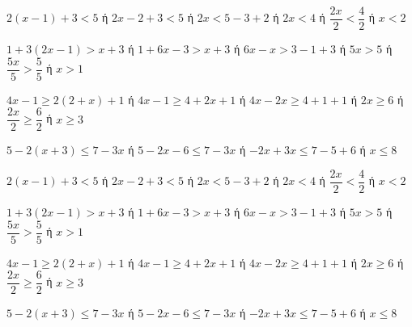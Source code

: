 \begin{alist}
\item $ 2(x-1)+3<5 $ ή $ 2x-2+3<5 $ ή $ 2x<5-3+2 $ ή $ 2x<4 $ ή $ \dfrac{2x}{2}<\dfrac{4}{2} $ ή $ x<2 $
\item $ 1+3(2x-1)>x+3 $ ή $ 1+6x-3>x+3 $ ή $ 6x-x>3-1+3 $ ή $ 5x>5 $ ή $ \dfrac{5x}{5}>\dfrac{5}{5} $ ή $ x>1 $
\item $ 4x-1\geq 2(2+x)+1 $ ή $ 4x-1\geq 4+2x+1 $ ή $ 4x-2x\geq 4+1+1 $ ή $ 2x\geq 6 $ ή $ \dfrac{2x}{2}\geq\dfrac{6}{2} $ ή $ x\geq 3 $
\item $ 5-2(x+3)\leq 7-3x $ ή $ 5-2x-6\leq 7-3x $ ή $ -2x+3x\leq 7-5+6 $ ή $ x\leq 8 $
\end{alist}
\begin{alist}
\item $ 2(x-1)+3<5 $ ή $ 2x-2+3<5 $ ή $ 2x<5-3+2 $ ή $ 2x<4 $ ή $ \dfrac{2x}{2}<\dfrac{4}{2} $ ή $ x<2 $
\item $ 1+3(2x-1)>x+3 $ ή $ 1+6x-3>x+3 $ ή $ 6x-x>3-1+3 $ ή $ 5x>5 $ ή $ \dfrac{5x}{5}>\dfrac{5}{5} $ ή $ x>1 $
\item $ 4x-1\geq 2(2+x)+1 $ ή $ 4x-1\geq 4+2x+1 $ ή $ 4x-2x\geq 4+1+1 $ ή $ 2x\geq 6 $ ή $ \dfrac{2x}{2}\geq\dfrac{6}{2} $ ή $ x\geq 3 $
\item $ 5-2(x+3)\leq 7-3x $ ή $ 5-2x-6\leq 7-3x $ ή $ -2x+3x\leq 7-5+6 $ ή $ x\leq 8 $
\end{alist}
